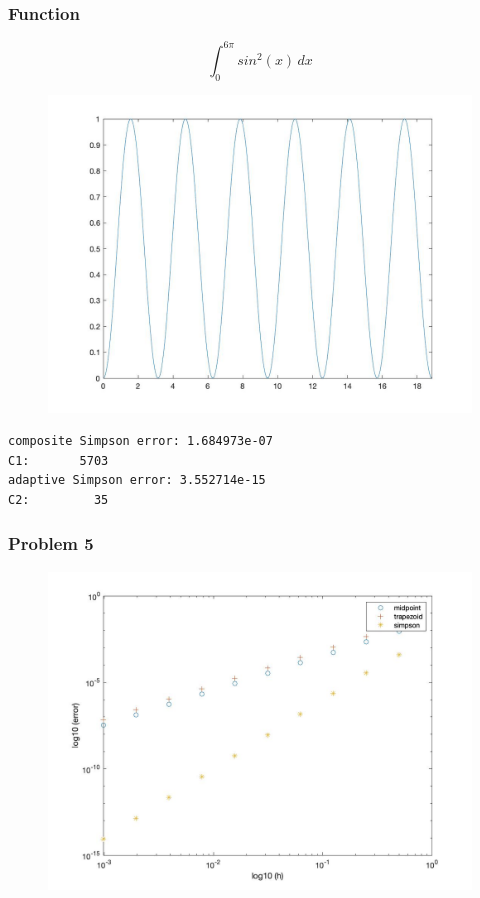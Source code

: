 \documentclass[11pt,fleqn]{exam}
\begin{document}
\subsubsection*{Function}
$$\int_{0}^{6\pi} sin^2(x) \,dx$$

\begin{figure}[H]
  	\centering
  	\includegraphics[width=1\textwidth]{p4.jpg}
\end{figure}

\begin{lstlisting}
composite Simpson error: 1.684973e-07
C1:       5703
adaptive Simpson error: 3.552714e-15
C2:         35
\end{lstlisting}

\subsubsection*{Problem 5}
\begin{figure}[H]
  	\centering
  	\includegraphics[width=1\textwidth]{p5.jpg}
\end{figure}
\end{document}
